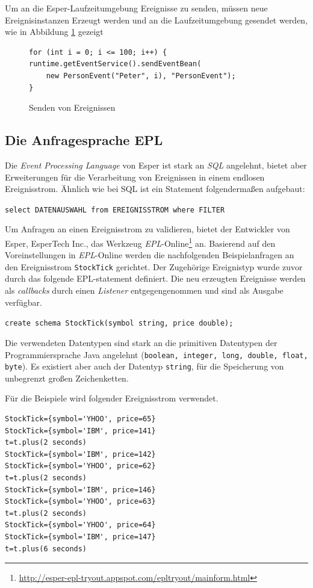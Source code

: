 \documentclass{acm_proc_article-sp}
\begin{document}
Um an die Esper-Laufzeitumgebung Ereignisse zu senden, müssen neue Ereignisinstanzen 
Erzeugt werden und an die Laufzeitumgebung gesendet werden, wie in Abbildung \ref{java:03}
gezeigt

\begin{figure}[h]    
\begin{verbatim}
for (int i = 0; i <= 100; i++) {
runtime.getEventService().sendEventBean(
    new PersonEvent("Peter", i), "PersonEvent");
}
\end{verbatim}
\caption{Senden von Ereignissen}
\label{java:03}
\end{figure}
\newpage
\subsection{Die Anfragesprache EPL}\label{kap:epl}
\vspace{0.1cm}
Die \textit{Event Processing Language} von Esper ist stark an \textit{SQL} angelehnt, 
bietet aber Erweiterungen für die Verarbeitung von Ereignissen in einem endlosen 
Ereignisstrom. Ähnlich wie bei SQL ist ein Statement folgendermaßen aufgebaut:

\texttt{select DATENAUSWAHL from EREIGNISSTROM where FILTER}

Um Anfragen an einen Ereignisstrom zu validieren, bietet der Entwickler von Esper, 
EsperTech Inc., das Werkzeug 
\textit{EPL}-Online\footnote{\url{http://esper-epl-tryout.appspot.com/epltryout/mainform.html}}
an. Basierend auf den 
Voreinstellungen in \textit{EPL}-Online werden die nachfolgenden Beispielanfragen an den 
Ereignisstrom \texttt{StockTick} gerichtet. Der Zugehörige Ereignistyp wurde zuvor durch 
das folgende EPL-statement definiert. Die neu erzeugten Ereignisse werden als 
\textit{callbacks} durch einen \textit{Listener} entgegengenommen und sind als Ausgabe 
verfügbar.

\texttt{create schema StockTick(symbol string, price double);}

Die verwendeten Datentypen sind stark an die primitiven Datentypen der Programmiersprache 
Java angelehnt (\texttt{boolean, integer, long, double, float, byte}). Es existiert aber 
auch der Datentyp \texttt{string}, für die Speicherung von unbegrenzt großen 
Zeichenketten.

Für die Beispiele wird folgender Ereignisstrom verwendet.

\begin{verbatim}
StockTick={symbol='YHOO', price=65}
StockTick={symbol='IBM', price=141}
t=t.plus(2 seconds)
StockTick={symbol='IBM', price=142}
StockTick={symbol='YHOO', price=62}
t=t.plus(2 seconds)
StockTick={symbol='IBM', price=146}
StockTick={symbol='YHOO', price=63}
t=t.plus(2 seconds)
StockTick={symbol='YHOO', price=64}
StockTick={symbol='IBM', price=147}
t=t.plus(6 seconds)
\end{verbatim}
\end{document}
